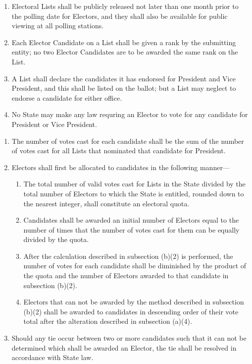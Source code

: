 \documentclass{article}
\begin{document}
\begin{enumerate}
        \item Electoral Lists shall be publicly released not later than one month prior to the polling date for Electors, and they shall also be available for public viewing at all polling stations.
        \item Each Elector Candidate on a List shall be given a rank by the submitting entity; no two Elector Candidates are to be awarded the same rank on the List.
        \item A List shall declare the candidates it has endorsed for President and Vice President, and this shall be listed on the ballot; but a List may neglect to endorse a candidate for either office.
        \item No State may make any law requring an Elector to vote for any candidate for President or Vice President.
    \end{enumerate}
    \begin{enumerate}
        \item The number of votes cast for each candidate shall be the sum of the number of votes cast for all Lists that nominated that candidate for President.
        \item Electors shall first be allocated to candidates in the following manner---
        \begin{enumerate}
            \item The total number of valid votes cast for Lists in the State divided by the total number of Electors to which the State is entitled, rounded down to the nearest integer, shall constitute an electoral quota.
            \item Candidates shall be awarded an initial number of Electors equal to the number of times that the number of votes cast for them can be equally divided by the quota.
            \item After the calculation described in subsection (b)(2) is performed, the number of votes for each candidate shall be diminished by the product of the quota and the number of Electors awarded to that candidate in subsection (b)(2).
            \item Electors that can not be awarded by the method described in subsection (b)(2) shall be awarded to candidates in descending order of their vote total after the alteration described in subsection (a)(4).
        \end{enumerate}
        \item Should any tie occur between two or more candidates such that it can not be determined which
        shall be awarded an Elector, the tie shall be resolved in accordance with State law.
    \end{enumerate}
\end{document}
